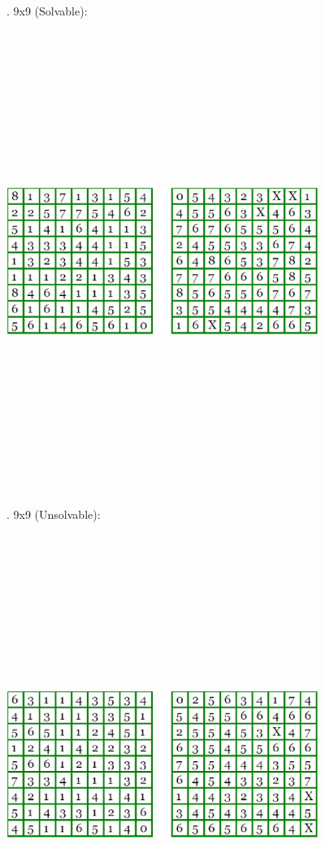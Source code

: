 \documentclass[12pt, letterpaper]{article}
\begin{document}
\bigskip	
{}. 9x9 (Solvable):
	
\includegraphics[width=4in, height=15cm, keepaspectratio]{"Task 2/9x9 Puzzle (Solvable)"}
	
\bigskip
{}. 9x9 (Unsolvable):
	
\includegraphics[width=4in, height=15cm, keepaspectratio]{"Task 2/9x9 Puzzle (Unsolvable)"}
\end{document}
